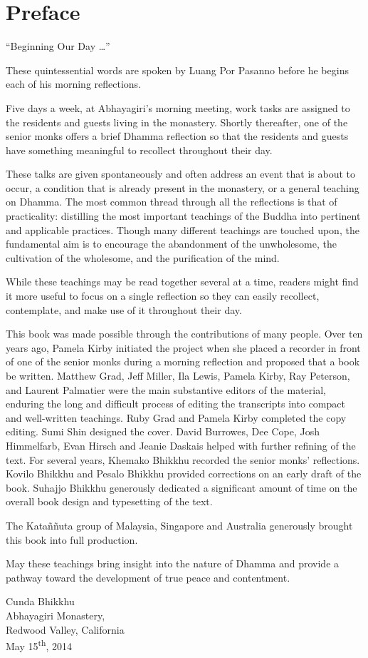 \chapter{Preface}

``Beginning Our Day \ldots{}''

These quintessential words are spoken by Luang Por Pasanno before he
begins each of his morning reflections.

Five days a week, at Abhayagiri's morning meeting, work tasks are
assigned to the residents and guests living in the monastery. Shortly
thereafter, one of the senior monks offers a brief Dhamma reflection so
that the residents and guests have something meaningful to recollect
throughout their day.

These talks are given spontaneously and often address an event that is
about to occur, a condition that is already present in the monastery, or
a general teaching on Dhamma. The most common thread through all the
reflections is that of practicality: distilling the most important
teachings of the Buddha into pertinent and applicable practices. Though
many different teachings are touched upon, the fundamental aim is to
encourage the abandonment of the unwholesome, the cultivation of the
wholesome, and the purification of the mind.

While these teachings may be read together several at a time, readers
might find it more useful to focus on a single reflection so they can
easily recollect, contemplate, and make use of it throughout their day.

This book was made possible through the contributions of many people.
Over ten years ago, Pamela Kirby initiated the project when she placed a
recorder in front of one of the senior monks during a morning reflection
and proposed that a book be written. Matthew Grad, Jeff Miller, Ila
Lewis, Pamela Kirby, Ray Peterson, and Laurent Palmatier were the main
substantive editors of the material, enduring the long and difficult
process of editing the transcripts into compact and well-written
teachings. Ruby Grad and Pamela Kirby completed the copy editing. Sumi
Shin designed the cover. David Burrowes, Dee Cope, Josh Himmelfarb, Evan
Hirsch and Jeanie Daskais helped with further refining of the text. For
several years, Khemako Bhikkhu recorded the senior monks' reflections.
Kovilo Bhikkhu and Pesalo Bhikkhu provided corrections on an early draft
of the book. Suhajjo Bhikkhu generously dedicated a significant amount
of time on the overall book design and typesetting of the text.

The Kataññuta group of Malaysia, Singapore and Australia generously
brought this book into full production.

May these teachings bring insight into the nature of Dhamma and provide
a pathway toward the development of true peace and contentment.

\vspace{15pt}\noindent Cunda Bhikkhu\\
Abhayagiri Monastery,\\
Redwood Valley, California\\
May 15\textsuperscript{th}, 2014
